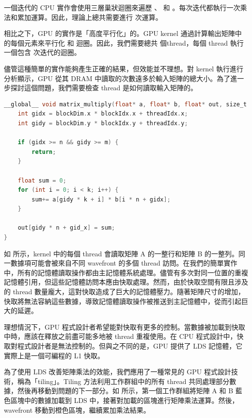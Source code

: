 一個迭代的 CPU 實作會使用三層巢狀迴圈來遍歷 、 和 。每次迭代都執行一次乘法和累加運算。因此，理論上總共需要進行  次運算。

相比之下，GPU 的實作是「高度平行化」的。GPU kernel 通過計算輸出矩陣中的每個元素來平行化  和  迴圈。因此，我們需要總共  個thread，每個 thread 執行一個包含  次迭代的迴圈。

儘管這種簡單的實作能夠產生正確的結果，但效能並不理想。對 kernel 執行進行分析顯示，GPU 從其 DRAM 中讀取的次數遠多於輸入矩陣的總大小。為了進一步探討這個問題，我們需要檢查 thread 是如何讀取輸入矩陣的。

\begin{lstlisting}[language=C, caption={簡單的 HIP kernel 用於矩陣乘法。}, captionpos=t, label={lst:naive}]
__global__ void matrix_multiply(float* a, float* b, float* out, size_t m, size_t n, size_t k) {
    int gidx = blockDim.x * blockIdx.x + threadIdx.x;
    int gidy = blockDim.y * blockIdx.y + threadIdx.y;

    if (gidx >= n && gidy >= m) {
        return;
    }

    float sum = 0;
    for (int i = 0; i < k; i++) {
        sum+= a[gidy * k + i] * b[i * n + gidx];
    }

    out[gidy * n + gid_x] = sum;
}
\end{lstlisting}

如  所示，kernel 中的每個 thread 會讀取矩陣 A 的一整行和矩陣 B 的一整列。同一數據項可能會被來自不同 wavefront 的多個 thread 訪問。在我們的簡單實作中，所有的記憶體讀取操作都由主記憶體系統處理。儘管有多次對同一位置的重複記憶體引用，但這些記憶體訪問本應由快取處理。然而，由於快取空間有限且涉及的 thread 數量龐大，這對快取造成了巨大的記憶體壓力。隨著矩陣尺寸的增加，快取將無法容納這些數據，導致記憶體讀取操作被推送到主記憶體中，從而引起巨大的延遲。

理想情況下，GPU 程式設計者希望能對快取有更多的控制。當數據被加載到快取中時，應該在釋放之前盡可能多地被 thread 重複使用。在 CPU 程式設計中，快取對程式設計者是無法控制的。但與之不同的是，GPU 提供了 LDS 記憶體，它實際上是一個可編程的 L1 快取。

為了使用 LDS 改善矩陣乘法的效能，我們應用了一種常見的 GPU 程式設計技術，稱為「tiling」。Tiling 方法利用工作群組中的所有 thread 共同處理部分數據，然後再移動到問題的下一部分。如  所示，第一個工作群組將矩陣 A 和 B 藍色區塊中的數據加載到 LDS 中，接著對加載的區塊進行矩陣乘法運算。然後，wavefront 移動到橙色區塊，繼續累加乘法結果。

